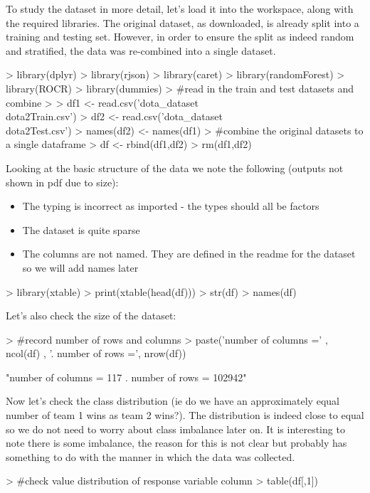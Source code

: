 \documentclass[10pt]{article}
\begin{document}
To study the dataset in more detail, let's load it into the workspace, along with the required libraries. The original dataset, as downloaded, is already split into a training and testing set. However, in order to ensure the split as indeed random and stratified, the data was re-combined into a single dataset.

\begin{Schunk}
\begin{Sinput}
> library(dplyr)
> library(rjson)
> library(caret)
> library(randomForest)
> library(ROCR)
> library(dummies)
> #read in the train and test datasets and combine 
> 
> df1 <- read.csv('dota_dataset\\dota2Train.csv')
> df2 <- read.csv('dota_dataset\\dota2Test.csv')
> names(df2) <- names(df1)
> #combine the original datasets to a single dataframe
> df <- rbind(df1,df2)
> rm(df1,df2)
\end{Sinput}
\end{Schunk}

Looking at the basic structure of the data we note the following (outputs not shown in pdf due to size):
 
\begin{itemize}
  \item The typing is incorrect as imported - the types should all be factors
  \item The dataset is quite sparse
  \item The columns are not named. They are defined in the readme for the dataset so we will add names later
\end{itemize}

\begin{Schunk}
\begin{Sinput}
> library(xtable)
> print(xtable(head(df)))
> str(df)
> names(df)
\end{Sinput}
\end{Schunk}
Let's also check the size of the dataset:
\begin{Schunk}
\begin{Sinput}
> #record number of rows and columns
> paste('number of columns =' , ncol(df) , '. number of rows =', nrow(df))
\end{Sinput}
\begin{Soutput}
[1] "number of columns = 117 . number of rows = 102942"
\end{Soutput}
\end{Schunk}

Now let's check the class distribution (ie do we have an approximately equal number of team 1 wins as team 2 wins?).
The distribution is indeed close to equal so we do not need to worry about class imbalance later on. It is interesting to note there is some imbalance, the reason for this is not clear but probably has something to do with the manner in which the data was collected.
\begin{Schunk}
\begin{Sinput}
> #check value distribution of response variable column
> table(df[,1])
\end{Sinput}
\end{Schunk}
\end{document}
